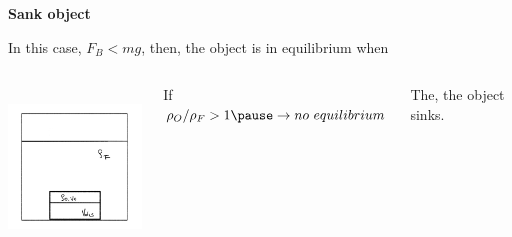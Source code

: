 \documentclass[]{beamer}
\begin{document}
\begin{frame}


\textbf{Sank object} 

\vspace{3mm}
In this case, $F_B<mg$, then, the object is in equilibrium when


\begin{columns}[c]
   \column{2in}  %

   \begin{center}
  \includegraphics[height=1.7in]{images2/Buoyance3c.jpg}
\end{center}
 
   \column{2in}



   If   $\rho_O/\rho_{F }>1\pause\rightarrow no ~equilibrium$ 
   
   \pause

   \vspace{3mm}
   
   The, the object sinks.


  


   \end{columns}



  \end{frame}

\end{document}
